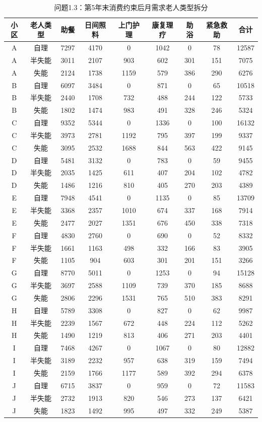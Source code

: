 \begin{table}[h]
\centering
\caption{问题1.3：第5年末消费约束后月需求老人类型拆分}
\begin{tabular}{|c|c|c|c|c|c|c|c|c|}
\hline
小区 & 老人类型 & 助餐 & 日间照料 & 上门护理 & 康复理疗 & 助浴 & 紧急救助 & 合计 \\
\hline
A & 自理 & 7297 & 4170 & 0 & 1042 & 0 & 78 & 12587 \\
A & 半失能 & 3011 & 2107 & 903 & 602 & 301 & 151 & 7075 \\
A & 失能 & 2124 & 1738 & 1159 & 579 & 386 & 290 & 6276 \\
B & 自理 & 6097 & 3484 & 0 & 871 & 0 & 65 & 10518 \\
B & 半失能 & 2440 & 1708 & 732 & 488 & 244 & 122 & 5733 \\
B & 失能 & 1802 & 1474 & 983 & 491 & 328 & 246 & 5324 \\
C & 自理 & 9352 & 5344 & 0 & 1336 & 0 & 100 & 16132 \\
C & 半失能 & 3973 & 2781 & 1192 & 795 & 397 & 199 & 9337 \\
C & 失能 & 3095 & 2532 & 1688 & 844 & 563 & 422 & 9145 \\
D & 自理 & 5481 & 3132 & 0 & 783 & 0 & 59 & 9455 \\
D & 半失能 & 2035 & 1425 & 611 & 407 & 204 & 102 & 4782 \\
D & 失能 & 1486 & 1216 & 810 & 405 & 270 & 203 & 4389 \\
E & 自理 & 7948 & 4541 & 0 & 1135 & 0 & 85 & 13709 \\
E & 半失能 & 3368 & 2357 & 1010 & 674 & 337 & 168 & 7914 \\
E & 失能 & 2477 & 2027 & 1351 & 676 & 450 & 338 & 7318 \\
F & 自理 & 4830 & 2760 & 0 & 690 & 0 & 52 & 8332 \\
F & 半失能 & 1661 & 1163 & 498 & 332 & 166 & 83 & 3905 \\
F & 失能 & 1105 & 904 & 603 & 301 & 201 & 151 & 3266 \\
G & 自理 & 8770 & 5011 & 0 & 1253 & 0 & 94 & 15128 \\
G & 半失能 & 3697 & 2588 & 1109 & 739 & 370 & 185 & 8688 \\
G & 失能 & 2806 & 2296 & 1531 & 765 & 510 & 383 & 8291 \\
H & 自理 & 5789 & 3308 & 0 & 827 & 0 & 62 & 9987 \\
H & 半失能 & 2239 & 1567 & 672 & 448 & 224 & 112 & 5262 \\
H & 失能 & 1490 & 1219 & 813 & 406 & 271 & 203 & 4401 \\
I & 自理 & 7468 & 4267 & 0 & 1067 & 0 & 80 & 12882 \\
I & 半失能 & 3189 & 2232 & 957 & 638 & 319 & 159 & 7494 \\
I & 失能 & 2159 & 1766 & 1177 & 589 & 392 & 294 & 6378 \\
J & 自理 & 6715 & 3837 & 0 & 959 & 0 & 72 & 11583 \\
J & 半失能 & 2732 & 1913 & 820 & 546 & 273 & 137 & 6421 \\
J & 失能 & 1823 & 1492 & 995 & 497 & 332 & 249 & 5387 \\
\hline
\end{tabular}
\end{table}
